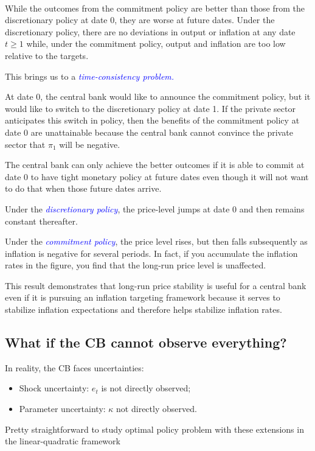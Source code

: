 \begin{remark}
    \

    While the outcomes from the commitment policy are better than those from the discretionary policy at date 0, 
    they are worse at future dates. Under the discretionary policy, there are no deviations in output or inflation at any date $t \geq 1$ while, 
    under the commitment policy, output and inflation are too low relative to the targets. 
    
    This brings us to a \textcolor{blue}{\textit{time-consistency problem.}}
    
    At date 0, the central bank would like to announce the commitment policy, 
    but it would like to switch to the discretionary policy at date 1. 
    If the private sector anticipates this switch in policy, 
    then the benefits of the commitment policy at date 0 are unattainable 
    because the central bank cannot convince the private sector that $\pi_1$ will be negative. 
    
    The central bank can only achieve the better outcomes if 
    it is able to commit at date 0 to have tight monetary policy at future dates even though 
    it will not want to do that when those future dates arrive.

    Under the \textcolor{blue}{\textit{discretionary policy}}, 
    the price-level jumps at date 0 and then remains constant thereafter.

    Under the \textcolor{blue}{\textit{commitment policy}}, the price level rises, 
    but then falls subsequently as inflation is negative for several periods. 
    In fact, if you accumulate the inflation rates in the figure, 
    you find that the long-run price level is unaffected. 
    
    This result demonstrates that long-run price stability is useful for a central bank 
    even if it is pursuing an inflation targeting framework because it serves to stabilize inflation expectations 
    and therefore helps stabilize inflation rates.
\end{remark}

\subsection{What if the CB cannot observe everything?}
In reality, the CB faces uncertainties:
\begin{itemize}
    \item Shock uncertainty: $e_t$ is not directly observed;
    \item Parameter uncertainty: $\kappa$ not directly observed.
\end{itemize}
Pretty straightforward to study optimal policy problem with these
extensions in the linear-quadratic framework


